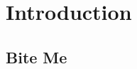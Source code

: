 \documentclass[ebook]{memoir}
\begin{document}
\frontmatter
\tableofcontents*

\mainmatter
\chapter{Introduction}
\lipsum[1]

\begin{appendices}
\chapter{Bite Me}
\end{appendices}
\lipsum[2]

\backmatter
\end{document}
